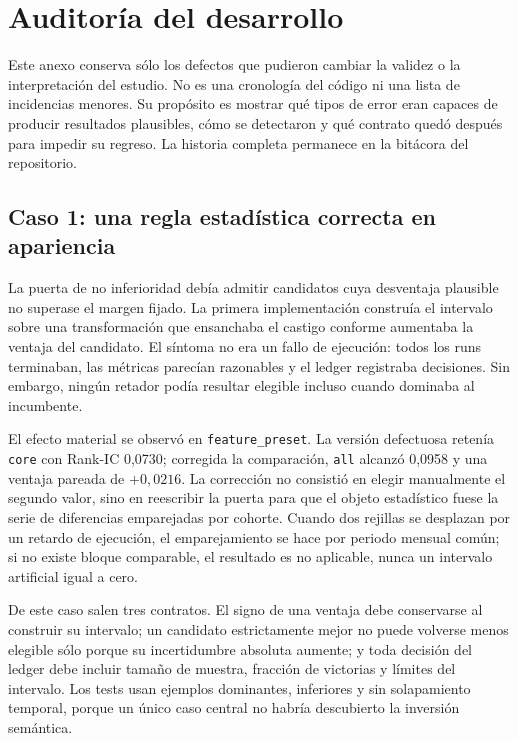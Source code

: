 \chapter{Auditoría del desarrollo}
\label{anexo:desarrollo}

Este anexo conserva sólo los defectos que pudieron cambiar la validez o la interpretación del
estudio. No es una cronología del código ni una lista de incidencias menores. Su propósito es
mostrar qué tipos de error eran capaces de producir resultados plausibles, cómo se detectaron y qué
contrato quedó después para impedir su regreso. La historia completa permanece en la bitácora del
repositorio.

\begin{table}[H]
  \centering
  \footnotesize
  \caption{Defectos del desarrollo con impacto sobre la validez.}
  \label{tab:defectos}
  \resizebox{\textwidth}{!}{}
\end{table}

\section{Caso 1: una regla estadística correcta en apariencia}

La puerta de no inferioridad debía admitir candidatos cuya desventaja plausible no superase el
margen fijado. La primera implementación construía el intervalo sobre una transformación que
ensanchaba el castigo conforme aumentaba la ventaja del candidato. El síntoma no era un fallo de
ejecución: todos los runs terminaban, las métricas parecían razonables y el ledger registraba
decisiones. Sin embargo, ningún retador podía resultar elegible incluso cuando dominaba al
incumbente.

El efecto material se observó en \texttt{feature\_preset}. La versión defectuosa retenía
\texttt{core} con Rank-IC 0,0730; corregida la comparación, \texttt{all} alcanzó 0,0958 y una ventaja
pareada de $+0{,}0216$. La corrección no consistió en elegir manualmente el segundo valor, sino en
reescribir la puerta para que el objeto estadístico fuese la serie de diferencias emparejadas por
cohorte. Cuando dos rejillas se desplazan por un retardo de ejecución, el emparejamiento se hace por
periodo mensual común; si no existe bloque comparable, el resultado es no aplicable, nunca un
intervalo artificial igual a cero.

De este caso salen tres contratos. El signo de una ventaja debe conservarse al construir su
intervalo; un candidato estrictamente mejor no puede volverse menos elegible sólo porque su
incertidumbre absoluta aumente; y toda decisión del ledger debe incluir tamaño de muestra, fracción
de victorias y límites del intervalo. Los tests usan ejemplos dominantes, inferiores y sin
solapamiento temporal, porque un único caso central no habría descubierto la inversión semántica.

